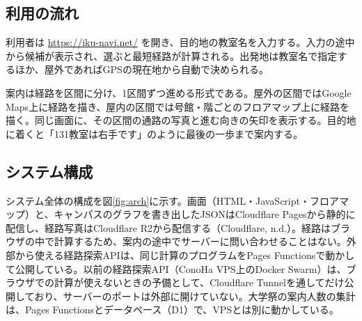 \documentclass[
  paper=a4paper,
  fontsize=10.5pt,
  jafontsize=10.5pt,
  twocolumn,
  line_length=82.5mm,   %
  column_gap=5mm,
  gutter=20mm,          %
  number_of_lines=35,   %
  head_space=25mm,      %
  baselineskip=20.36pt, %
]{jlreq}
\begin{document}
\subsection{利用の流れ}

利用者は \url{https://iku-navi.net/} を開き、目的地の教室名を入力する。入力の途中から候補が表示され、選ぶと最短経路が計算される。出発地は教室名で指定するほか、屋外であればGPSの現在地から自動で決められる。

案内は経路を区間に分け、1区間ずつ進める形式である。屋外の区間ではGoogle Maps上に経路を描き、屋内の区間では号館・階ごとのフロアマップ上に経路を描く。同じ画面に、その区間の通路の写真と進む向きの矢印を表示する。目的地に着くと「131教室は右手です」のように最後の一歩まで案内する。

\subsection{システム構成}

システム全体の構成を図\ref{fig:arch}に示す。画面（HTML・JavaScript・フロアマップ）と、キャンパスのグラフを書き出したJSONはCloudflare Pagesから静的に配信し、経路写真はCloudflare R2から配信する（Cloudflare, n.d.）。経路はブラウザの中で計算するため、案内の途中でサーバーに問い合わせることはない。外部から使える経路探索APIは、同じ計算のプログラムをPages Functionsで動かして公開している。以前の経路探索API（ConoHa VPS上のDocker Swarm）は、ブラウザでの計算が使えないときの予備として、Cloudflare Tunnelを通してだけ公開しており、サーバーのポートは外部に開けていない。大学祭の案内人数の集計は、Pages Functionsとデータベース（D1）で、VPSとは別に動かしている。
\end{document}
